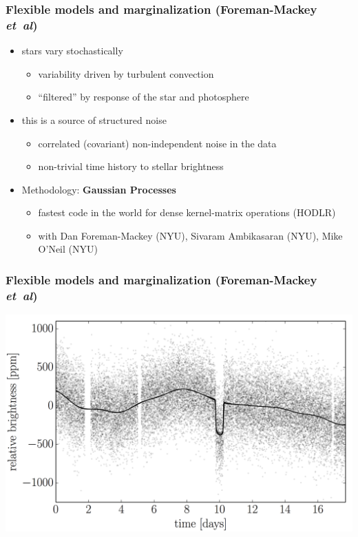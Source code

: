 \documentclass[aspectratio=169]{beamer}
\newcommand{\foreign}[1]{\textsl{#1}}
\newcommand{\etal}{\foreign{et~al}}
\renewcommand{\emph}[1]{\textbf{#1}}
\begin{document}
\begin{frame}
  \frametitle{Flexible models and marginalization \small{(Foreman-Mackey \etal)}}
  \begin{itemize}
  \item stars vary stochastically
    \begin{itemize}
    \item variability driven by turbulent convection
    \item ``filtered'' by response of the star and photosphere
    \end{itemize}
  \item this is a source of structured noise
    \begin{itemize}
    \item correlated (covariant) non-independent noise in the data
    \item non-trivial time history to stellar brightness
    \end{itemize}
  \item Methodology: \emph{Gaussian Processes}
    \begin{itemize}
    \item fastest code in the world for dense kernel-matrix operations (HODLR)
    \item with Dan Foreman-Mackey (NYU), Sivaram Ambikasaran (NYU), Mike O'Neil (NYU)
    \end{itemize}
  \end{itemize}
\end{frame}

\begin{frame}
  \frametitle{Flexible models and marginalization \small{(Foreman-Mackey \etal)}}
  \includegraphics[height=0.85\textheight]{kepler-prediction.png}
\end{frame}
\end{document}
